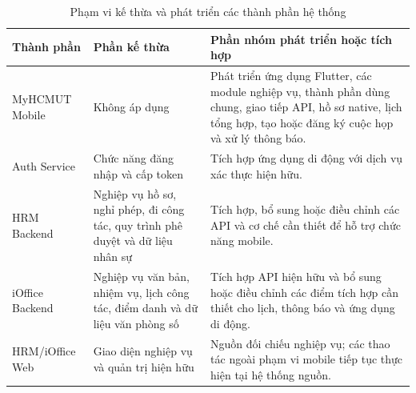 \begin{table}[H]
\centering
\caption[Phạm vi kế thừa và phát triển các thành phần]{Phạm vi kế thừa và phát triển các thành phần hệ thống}
\label{tab:component_ownership_scope}
\begin{tabularx}{\textwidth}{|L{3.0cm}|L{4.2cm}|Y|}
\hline
\textbf{Thành phần} & \textbf{Phần kế thừa} & \textbf{Phần nhóm phát triển hoặc tích hợp} \\
\hline
MyHCMUT Mobile & Không áp dụng & Phát triển ứng dụng Flutter, các module nghiệp vụ, thành phần dùng chung, giao tiếp API, hồ sơ native, lịch tổng hợp, tạo hoặc đăng ký cuộc họp và xử lý thông báo. \\
\hline
Auth Service & Chức năng đăng nhập và cấp token & Tích hợp ứng dụng di động với dịch vụ xác thực hiện hữu. \\
\hline
HRM Backend & Nghiệp vụ hồ sơ, nghỉ phép, đi công tác, quy trình phê duyệt và dữ liệu nhân sự & Tích hợp, bổ sung hoặc điều chỉnh các API và cơ chế cần thiết để hỗ trợ chức năng mobile. \\
\hline
iOffice Backend & Nghiệp vụ văn bản, nhiệm vụ, lịch công tác, điểm danh và dữ liệu văn phòng số & Tích hợp API hiện hữu và bổ sung hoặc điều chỉnh các điểm tích hợp cần thiết cho lịch, thông báo và ứng dụng di động. \\
\hline
HRM/iOffice Web & Giao diện nghiệp vụ và quản trị hiện hữu & Nguồn đối chiếu nghiệp vụ; các thao tác ngoài phạm vi mobile tiếp tục thực hiện tại hệ thống nguồn. \\
\hline
\end{tabularx}
\end{table}
